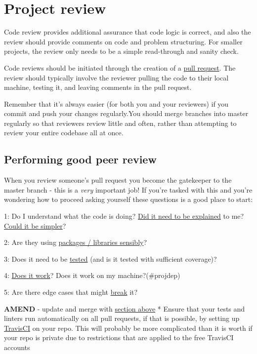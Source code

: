 \documentclass[]{book}
\begin{document}
\hypertarget{review}{%
\section{Project review}\label{review}}

Code review provides additional assurance that code logic is correct, and also the review should provide comments on code and problem structuring. For smaller projects, the review only needs to be a simple read-through and sanity check.

Code reviews should be initiated through the creation of a \protect\hyperlink{flow}{pull request}. The review should typically involve the reviewer pulling the code to their local machine, testing it, and leaving comments in the pull request.

Remember that it's always easier (for both you and your reviewers) if you commit and push your changes regularly.You should merge branches into master regularly so that reviewers review little and often, rather than attempting to review your entire codebase all at once.

\hypertarget{performing-good-peer-review}{%
\subsection*{Performing good peer review}\label{performing-good-peer-review}}

When you review someone's pull request you become the gatekeeper to the master branch - this is a \emph{very} important job! If you're tasked with this and you're wondering how to proceed asking yourself these questions is a good place to start:

1: Do I understand what the code is doing? \protect\hyperlink{ccc}{Did it need to be explained} to me? \protect\hyperlink{ccc}{Could it be simpler}?

2: Are they using \protect\hyperlink{defaults}{packages / libraries sensibly}?

3: Does it need to be \protect\hyperlink{unittest}{tested} (and is it tested with sufficient coverage)?

4: \protect\hyperlink{ccc}{Does it work}? Does it work on my machine?(\#projdep)

5: Are there edge cases that might \protect\hyperlink{unittest}{break} it?

\textbf{AMEND} - update and merge with \protect\hyperlink{defaults}{section above}
* Ensure that your tests and linters run automatically on all pull requests, if that is possible, by setting up \href{https://travis-ci.org/}{TravisCI} on your repo. This will probably be more complicated than it is worth if your repo is private due to restrictions that are applied to the free TravisCI accounts
\end{document}
